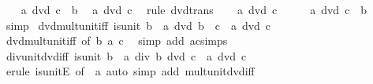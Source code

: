 \begin{isabellebody}
\ \ \isamarkupfalse%
\ {\isacartoucheopen}a\ dvd\ c\ {\isacharasterisk}{\kern0pt}\ b{\isacartoucheclose}\ \isamarkupfalse%
\ {\isachardoublequoteopen}a\ dvd\ c{\isachardoublequoteclose}\ \isamarkupfalse%
\ {\isacharparenleft}{\kern0pt}rule\ dvd{\isacharunderscore}{\kern0pt}trans{\isacharparenright}{\kern0pt}\isanewline
{}\isamarkupfalse%
\isanewline
\ \ \isamarkupfalse%
\ {\isachardoublequoteopen}a\ dvd\ c{\isachardoublequoteclose}\isanewline
\ \ \isamarkupfalse%
\ \isamarkupfalse%
\ {\isachardoublequoteopen}a\ dvd\ c\ {\isacharasterisk}{\kern0pt}\ b{\isachardoublequoteclose}\ \isamarkupfalse%
\ simp\isanewline
{}\isamarkupfalse%
%
\endisatagproof
{\isafoldproof}%
%
\isadelimproof
\isanewline
%
\endisadelimproof
\isanewline
{}\isamarkupfalse%
\ dvd{\isacharunderscore}{\kern0pt}mult{\isacharunderscore}{\kern0pt}unit{\isacharunderscore}{\kern0pt}iff{\isacharprime}{\kern0pt}{\isacharcolon}{\kern0pt}\ {\isachardoublequoteopen}is{\isacharunderscore}{\kern0pt}unit\ b\ {\isasymLongrightarrow}\ a\ dvd\ b\ {\isacharasterisk}{\kern0pt}\ c\ {\isasymlongleftrightarrow}\ a\ dvd\ c{\isachardoublequoteclose}\isanewline
%
\isadelimproof
\ \ %
\endisadelimproof
%
\isatagproof
{}\isamarkupfalse%
\ dvd{\isacharunderscore}{\kern0pt}mult{\isacharunderscore}{\kern0pt}unit{\isacharunderscore}{\kern0pt}iff\ {\isacharbrackleft}{\kern0pt}of\ b\ a\ c{\isacharbrackright}{\kern0pt}\ \isamarkupfalse%
\ {\isacharparenleft}{\kern0pt}simp\ add{\isacharcolon}{\kern0pt}\ ac{\isacharunderscore}{\kern0pt}simps{\isacharparenright}{\kern0pt}%
\endisatagproof
{\isafoldproof}%
%
\isadelimproof
\isanewline
%
\endisadelimproof
\isanewline
{}\isamarkupfalse%
\ div{\isacharunderscore}{\kern0pt}unit{\isacharunderscore}{\kern0pt}dvd{\isacharunderscore}{\kern0pt}iff{\isacharcolon}{\kern0pt}\ {\isachardoublequoteopen}is{\isacharunderscore}{\kern0pt}unit\ b\ {\isasymLongrightarrow}\ a\ div\ b\ dvd\ c\ {\isasymlongleftrightarrow}\ a\ dvd\ c{\isachardoublequoteclose}\isanewline
%
\isadelimproof
\ \ %
\endisadelimproof
%
\isatagproof
{}\isamarkupfalse%
\ {\isacharparenleft}{\kern0pt}erule\ is{\isacharunderscore}{\kern0pt}unitE\ {\isacharbrackleft}{\kern0pt}of\ {\isacharunderscore}{\kern0pt}\ a{\isacharbrackright}{\kern0pt}{\isacharparenright}{\kern0pt}\ {\isacharparenleft}{\kern0pt}auto\ simp\ add{\isacharcolon}{\kern0pt}\ mult{\isacharunderscore}{\kern0pt}unit{\isacharunderscore}{\kern0pt}dvd{\isacharunderscore}{\kern0pt}iff{\isacharparenright}{\kern0pt}%

\end{isabellebody}
